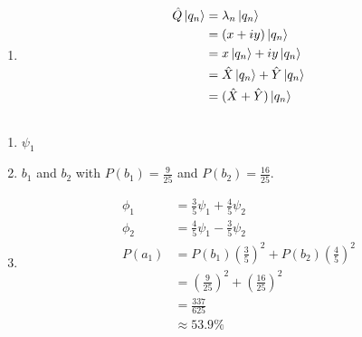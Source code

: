 \documentclass{article}
\begin{document}
\begin{enumerate}
  \item

        \begin{align*}
          \hat{Q} \ket{q_n} & = \lambda_n \ket{q_n}                   \\
                            & = (x + i y) \ket{q_n}                   \\
                            & = x \ket{q_n} + i y \ket{q_n}           \\
                            & = \hat{X} \ket{q_n} + \hat{Y} \ket{q_n} \\
                            & = (\hat{X} + \hat{Y}) \ket{q_n}
        \end{align*}
\end{enumerate}

\subsection{}

\begin{enumerate}
  \item $\psi_1$

  \item $b_1$ and $b_2$ with $P(b_1) = \frac{9}{25}$ and $P(b_2) = \frac{16}{25}$.

  \item

        \begin{align*}
          \phi_1 & = \frac{3}{5} \psi_1 + \frac{4}{5} \psi_2                                   \\
          \phi_2 & = \frac{4}{5} \psi_1 - \frac{3}{5} \psi_2                                   \\
          P(a_1) & = P(b_1) \left( \frac{3}{5} \right)^2 + P(b_2) \left( \frac{4}{5} \right)^2 \\
                 & = \left( \frac{9}{25} \right)^2 + \left( \frac{16}{25} \right)^2            \\
                 & = \frac{337}{625}                                                           \\
                 & \approx 53.9\%
        \end{align*}
\end{enumerate}

\subsection{}
\end{document}
